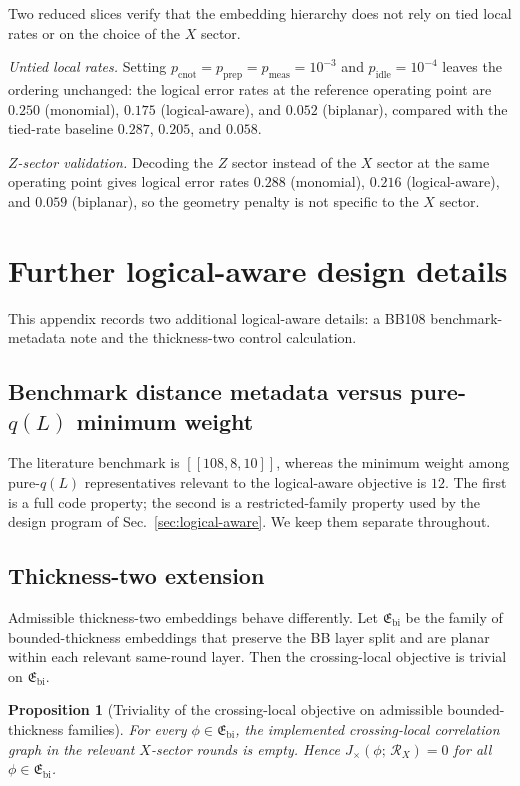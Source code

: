\documentclass[
aps,
prx,
10pt,
twocolumn,
groupedaddress,
longbibliography,
nofootinbib,
floatfix
]{revtex4-2}
\newtheorem{proposition}{Proposition}
\theoremstyle{definition}
\newcommand{\RX}{\mathcal{R}_X}
\newcommand{\bb}[1]{\ensuremath{\left[\!\left[#1\right]\!\right]}}
\begin{document}
Two reduced slices verify that the embedding hierarchy does not rely on tied local rates or on the choice of the $X$ sector.

\emph{Untied local rates.} Setting $p_{\mathrm{cnot}}=p_{\mathrm{prep}}=p_{\mathrm{meas}}=10^{-3}$ and $p_{\mathrm{idle}}=10^{-4}$ leaves the ordering unchanged: the logical error rates at the reference operating point are $0.250$ (monomial), $0.175$ (logical-aware), and $0.052$ (biplanar), compared with the tied-rate baseline $0.287$, $0.205$, and $0.058$.

\emph{$Z$-sector validation.} Decoding the $Z$ sector instead of the $X$ sector at the same operating point gives logical error rates $0.288$ (monomial), $0.216$ (logical-aware), and $0.059$ (biplanar), so the geometry penalty is not specific to the $X$ sector.

\section{Further logical-aware design details}
\label{app:la-details}

This appendix records two additional logical-aware details: a BB108 benchmark-metadata note and the thickness-two control calculation.

\subsection{Benchmark distance metadata versus pure-\texorpdfstring{$q(L)$}{q(L)} minimum weight}

The literature benchmark is \bb{108,8,10}, whereas the minimum weight among pure-$q(L)$ representatives relevant to the logical-aware objective is $12$. The first is a full code property; the second is a restricted-family property used by the design program of Sec.~\ref{sec:logical-aware}. We keep them separate throughout.

\subsection{Thickness-two extension}

Admissible thickness-two embeddings behave differently. Let $\mathfrak E_{\mathrm{bi}}$ be the family of bounded-thickness embeddings that preserve the BB layer split and are planar within each relevant same-round layer. Then the crossing-local objective is trivial on $\mathfrak E_{\mathrm{bi}}$.

\begin{proposition}[Triviality of the crossing-local objective on admissible bounded-thickness families]
For every $\phi\in\mathfrak E_{\mathrm{bi}}$, the implemented crossing-local correlation graph in the relevant $X$-sector rounds is empty. Hence $J_{\times}(\phi;\,\RX)=0$ for all $\phi\in\mathfrak E_{\mathrm{bi}}$.
\end{proposition}
\end{document}
